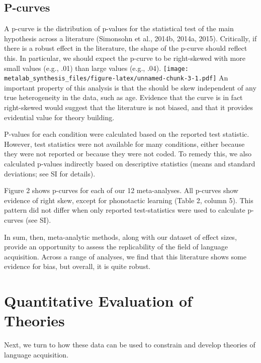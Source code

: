 \documentclass[english,floatsintext,man]{apa6}
\theoremstyle{definition}
\theoremstyle{definition}
\theoremstyle{remark}
\begin{document}
\subsection{P-curves}\label{p-curves}

A p-curve is the distribution of p-values for the statistical test of
the main hypothesis across a literature (Simonsohn et al., 2014b, 2014a,
2015). Critically, if there is a robust effect in the literature, the
shape of the p-curve should reflect this. In particular, we should
expect the p-curve to be right-skewed with more small values (e.g., .01)
than large values (e.g., .04).
\texttt{[image: metalab\_synthesis\_files/figure-latex/unnamed-chunk-3-1.pdf]}
An important property of this analysis is that the should be skew
independent of any true heterogeneity in the data, such as age. Evidence
that the curve is in fact right-skewed would suggest that the literature
is not biased, and that it provides evidential value for theory
building.

P-values for each condition were calculated based on the reported test
statistic. However, test statistics were not available for many
conditions, either because they were not reported or because they were
not coded. To remedy this, we also calculated p-values indirectly based
on descriptive statistics (means and standard deviations; see SI for
details).

Figure 2 shows p-curves for each of our 12 meta-analyses. All p-curves
show evidence of right skew, except for phonotactic learning (Table 2,
column 5). This pattern did not differ when only reported
test-statistics were used to calculate p-curves (see SI).

In sum, then, meta-analytic methods, along with our dataset of effect
sizes, provide an opportunity to assess the replicability of the field
of language acquisition. Across a range of analyses, we find that this
literature shows some evidence for bias, but overall, it is quite
robust.

\section{Quantitative Evaluation of
Theories}\label{quantitative-evaluation-of-theories}

Next, we turn to how these data can be used to constrain and develop
theories of language acquisition.
\end{document}
